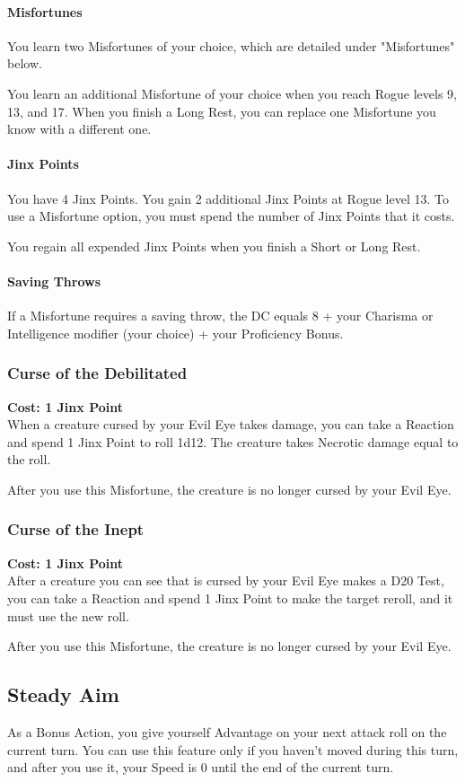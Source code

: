 \documentclass[letterpaper,openany,oneside,twocolumn]{book}
\begin{document}
\paragraph*{Misfortunes} You learn two Misfortunes of your choice, which are detailed under "Misfortunes" below.

You learn an additional Misfortune of your choice when you reach Rogue levels 9, 13, and 17. When you finish a Long Rest, you can replace one Misfortune you know with a different one.

\paragraph*{Jinx Points} You have 4 Jinx Points. You gain 2 additional Jinx Points at Rogue level 13. To use a Misfortune option, you must spend the number of Jinx Points that it costs.

You regain all expended Jinx Points when you finish a Short or Long Rest.

\paragraph*{Saving Throws} If a Misfortune requires a saving throw, the DC equals 8 + your Charisma or Intelligence modifier (your choice) + your Proficiency Bonus.
\subsubsection*{Curse of the Debilitated}
\textbf{Cost: 1 Jinx Point}\\
When a creature cursed by your Evil Eye takes damage, you can take a Reaction and spend 1 Jinx Point to roll 1d12. The creature takes Necrotic damage equal to the roll.

After you use this Misfortune, the creature is no longer cursed by your Evil Eye.
\subsubsection*{Curse of the Inept}
\textbf{Cost: 1 Jinx Point}\\
After a creature you can see that is cursed by your Evil Eye makes a D20 Test, you can take a Reaction and spend 1 Jinx Point to make the target reroll, and it must use the new roll.

After you use this Misfortune, the creature is no longer cursed by your Evil Eye.
\subsection*{Steady Aim}
As a Bonus Action, you give yourself Advantage on your next attack roll on the current turn. You can use this feature only if you haven't moved during this turn, and after you use it, your Speed is 0 until the end of the current turn.
\end{document}

